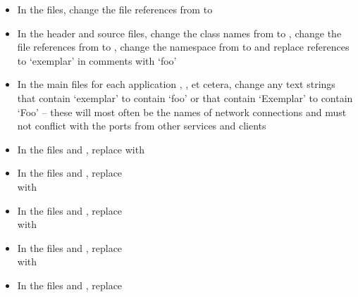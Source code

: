 \begin{itemize}
\item In the  files, change the file references from
 to 
\item In the  header and source files, change the class names from
 to , change the file references from
 to , change the namespace from
 to  and replace references to `exemplar' in comments with
`foo'
\item In the main files for each application \textbraceleft{},
, et cetera\textbraceright, change any text strings that
contain `exemplar' to contain `foo' or that contain `Exemplar' to contain `Foo' -- these
will most often be the names of \yarp{} network connections and must not conflict with the
ports from other services and clients
\item In the files  and , replace
 with
\item In the files  and
, replace\\
 with
\item In the files  and ,
replace\\
 with
\item In the files  and
, replace\\
 with
\item In the files  and , replace

\end{itemize}
